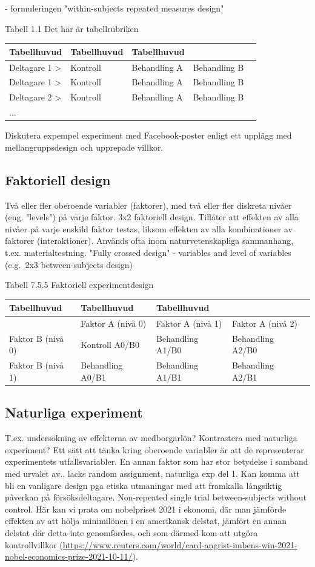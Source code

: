 \documentclass[
]{book}
\begin{document}
- formuleringen "within-subjects repeated measures design"

Tabell 1.1 Det här är tabellrubriken

\begin{longtable}[]{@{}lllll@{}}
\toprule
Tabellhuvud & Tabellhuvud & Tabellhuvud & &\tabularnewline
\midrule
\endhead
Deltagare 1 \textgreater{} & Kontroll & Behandling A & Behandling B &\tabularnewline
Deltagare 1 \textgreater{} & Kontroll & Behandling A & Behandling B &\tabularnewline
Deltagare 2 \textgreater{} & Kontroll & Behandling A & Behandling B &\tabularnewline
... & & & &\tabularnewline
\bottomrule
\end{longtable}

Diskutera expempel experiment med Facebook-poster enligt ett upplägg med mellangruppsdesign och upprepade villkor.

\hypertarget{sub07.5.6}{%
\subsection{Faktoriell design}\label{sub07.5.6}}

Två eller fler oberoende variabler (faktorer), med två eller fler diskreta nivåer (eng. "levels") på varje faktor. 3x2 faktoriell design. Tillåter att effekten av alla nivåer på varje enskild faktor testas, liksom effekten av alla kombinationer av faktorer (interaktioner). Används ofta inom naturvetenskapliga sammanhang, t.ex. materialtestning. "Fully crossed design" - variables and level of variables (e.g.~2x3 between-subjects design)

Tabell 7.5.5 Faktoriell experimentdesign

\begin{longtable}[]{@{}lllll@{}}
\toprule
Tabellhuvud & Tabellhuvud & Tabellhuvud & &\tabularnewline
\midrule
\endhead
& Faktor A (nivå 0) & Faktor A (nivå 1) & Faktor A (nivå 2) &\tabularnewline
Faktor B (nivå 0) & Kontroll A0/B0 & Behandling A1/B0 & Behandling A2/B0 &\tabularnewline
Faktor B (nivå 1) & Behandling A0/B1 & Behandling A1/B1 & Behandling A2/B1 &\tabularnewline
\bottomrule
\end{longtable}

\hypertarget{sub07.5.7}{%
\subsection{Naturliga experiment}\label{sub07.5.7}}

T.ex. undersökning av effekterna av medborgarlön? Kontrastera med naturliga experiment? Ett sätt att tänka kring oberoende variabler är att de representerar experimentets utfallsvariabler. En annan faktor som har stor betydelse i samband med urvalet av.. lacks random assignment, naturliga exp del 1. Kan komma att bli en vanligare design pga etiska utmaningar med att framkalla långsiktig påverkan på försöksdeltagare. Non-repeated single trial between-subjects without control. Här kan vi prata om nobelpriset 2021 i ekonomi, där man jämförde effekten av att hölja minimilönen i en amerikansk delstat, jämfört en annan delstat där detta inte genomfördes, och som därmed kom att utgöra kontrollvillkor (\url{https://www.reuters.com/world/card-angrist-imbens-win-2021-nobel-economics-prize-2021-10-11/}).
\end{document}
